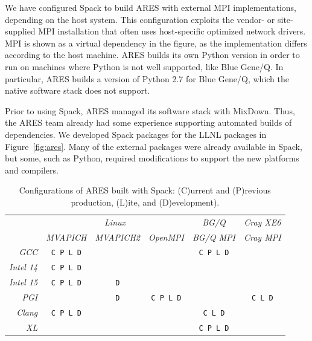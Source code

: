 We have configured Spack to build ARES with external MPI implementations, 
depending on the host system. This configuration exploits the vendor- 
or site-supplied MPI installation that often uses host-specific optimized 
network drivers. MPI is shown as a virtual dependency in the figure, as 
the implementation differs according to the host machine.  ARES builds its 
own Python version in order to run on machines where Python is not well 
supported, like Blue Gene/Q.  In particular, ARES builds a version of 
Python 2.7 for Blue Gene/Q, which the native software stack does not support.

Prior to using Spack, ARES managed its software stack with MixDown.
Thus, the ARES team already had some experience supporting 
automated builds of dependencies. We developed Spack packages for the LLNL 
packages in Figure~\ref{fig:ares}. Many of the external packages were already 
available in Spack, but some, such as Python, required modifications to support
the new platforms and compilers.

\newcommand{\hfmt}[1]{\textit{\scriptsize #1}}
\newcommand{\cfmt}[1]{\texttt{\scriptsize #1}}

\begin{table}\centering %
\footnotesize
\begin{tabular}{|r|c|c|c|c|c|}
\hline
\multirow{2}{*}{} & \multicolumn{3}{|c|}{\hfmt{Linux}}                      & {\hfmt{BG/Q}}     & {\hfmt{Cray XE6}} \\\cline{2-6}
                  & {\hfmt{MVAPICH}} & {\hfmt{MVAPICH2}} & {\hfmt{OpenMPI}} & {\hfmt{BG/Q MPI}} & {\hfmt{Cray MPI}} \\\hline
{\hfmt{GCC}}      & {\cfmt{C P L D}} &                   &                  & {\cfmt{C P L D}}  &                   \\\hline
{\hfmt{Intel 14}} & {\cfmt{C P L D}} &                   &                  &                   &                   \\\hline
{\hfmt{Intel 15}} & {\cfmt{C P L D}} & {\cfmt{D}}        &                  &                   &                   \\\hline
{\hfmt{PGI}}      &                  & {\cfmt{D}}        & {\cfmt{C P L D}} &                   & {\cfmt{C L D}}    \\\hline
{\hfmt{Clang}}    & {\cfmt{C P L D}} &                   &                  & {\cfmt{C L D}}    &                   \\\hline
{\hfmt{XL}}       &                  &                   &                  & {\cfmt{C P L D}}  &                   \\\hline
\end{tabular}
\caption{
	Configurations of ARES built with Spack: \newline
	(C)urrent and
	(P)revious production, (L)ite, and (D)evelopment).
	\label{tab:ares-configs}
}
\end{table}

